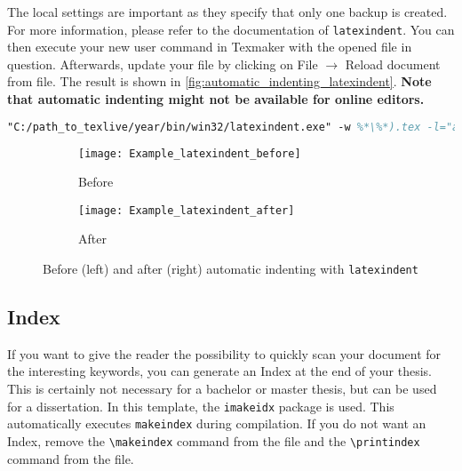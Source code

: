 The local settings are important as they specify that only one backup is created. For more information, please refer to the documentation of \verb+latexindent+. You can then execute your new user command in Texmaker with the opened file in question. Afterwards, update your file by clicking on File $\rightarrow$ Reload document from file. The result is shown in \autoref{fig:automatic_indenting_latexindent}. \textbf{Note that automatic indenting might not be available for online editors.}
\begin{lstlisting}[breaklines, caption={Setting up \texttt{latexindent} in Texmaker}, float=tbh, label={code:latexindent}, language=latex]
"C:/path_to_texlive/year/bin/win32/latexindent.exe" -w %*\%*).tex -l="absolute_path_to_thesis_template/Thesis_template/LaTeX_template_thesis/00_Arara_and_Latexindent/localSettings.yaml"
\end{lstlisting}
\begin{figure}[tbh]
	\centering
	\begin{subfigure}[t]{0.48\textwidth}
		\texttt{[image: Example\_latexindent\_before]}
		\caption{Before}\label{fig:latexindent_before}
	\end{subfigure}
	\hfill
	\begin{subfigure}[t]{0.48\textwidth}
		\texttt{[image: Example\_latexindent\_after]}
		\caption{After}\label{fig:latexindent_after}
	\end{subfigure}
	\caption[Before and after automatic indenting with \texttt{latexindent}]{Before (left) and after (right) automatic indenting with \texttt{latexindent}}\label{fig:automatic_indenting_latexindent}
\end{figure}
\subsection{Index}\label{subsec:index}
If you want to give the reader the possibility to quickly scan your document for the interesting keywords, you can generate an Index at the end of your thesis. This is certainly not necessary for a bachelor or master thesis, but can be used for a dissertation. In this template, the \verb+imakeidx+ package is used. This automatically executes \verb+makeindex+ during compilation. If you do not want an Index, remove the \verb+\makeindex+ command from the  file and the \verb+\printindex+ command from the  file.

